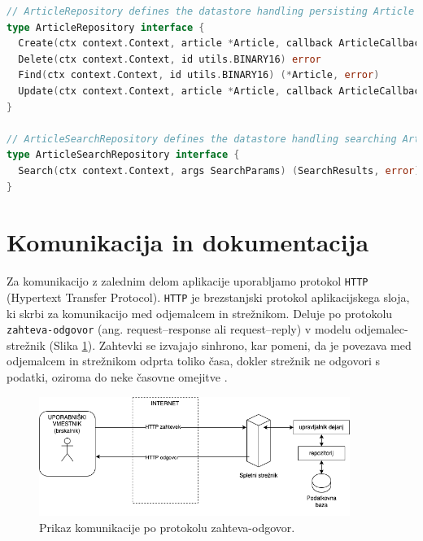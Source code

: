 \begin{lstlisting}[language=go, style=mystyle,caption={Vmesnik, ki definira repozitorij za publikacije.},label=lst:article-repository]
// ArticleRepository defines the datastore handling persisting Article records.
type ArticleRepository interface {
  Create(ctx context.Context, article *Article, callback ArticleCallbackFn) (*Article, error)
  Delete(ctx context.Context, id utils.BINARY16) error
  Find(ctx context.Context, id utils.BINARY16) (*Article, error)
  Update(ctx context.Context, article *Article, callback ArticleCallbackFn) (*Article, error)
}

// ArticleSearchRepository defines the datastore handling searching Article records.
type ArticleSearchRepository interface {
  Search(ctx context.Context, args SearchParams) (SearchResults, error)
}
\end{lstlisting}

\section{Komunikacija in dokumentacija}
Za komunikacijo z zalednim delom aplikacije uporabljamo protokol \verb=HTTP= (Hypertext Transfer Protocol). \verb=HTTP= je brezstanjski protokol aplikacijskega sloja, ki skrbi za komunikacijo med odjemalcem in strežnikom. Deluje po protokolu \verb=zahteva-odgovor= (ang. request–response ali request–reply) v modelu odjemalec-strežnik (Slika \ref{communication-flow}). Zahtevki se izvajajo sinhrono, kar pomeni, da je povezava med odjemalcem in strežnikom odprta toliko časa, dokler strežnik ne odgovori s podatki, oziroma do neke časovne omejitve \cite{http-rfc}.


\begin{figure}[h]
\begin{center}
\includegraphics[width=0.9\textwidth]{slike/communication.png}
\end{center}
\caption{ Prikaz komunikacije po protokolu zahteva-odgovor. }
\label{communication-flow}
\end{figure}

